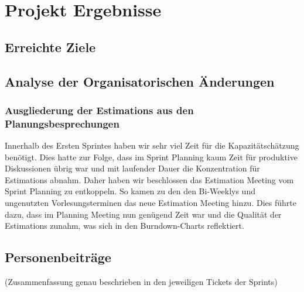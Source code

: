 
\chapter{Projekt Ergebnisse}

\section{Erreichte Ziele}

\section{Analyse der Organisatorischen Änderungen}

\subsection{Ausgliederung der Estimations aus den Planungsbesprechungen}

Innerhalb des Ersten Sprintes haben wir sehr viel Zeit für die Kapazitätschätzung benötigt. 
Dies hatte zur Folge, dass im Sprint Planning kaum Zeit für produktive Diskussionen übrig war und mit laufender Dauer die Konzentration für Estimations abnahm.
Daher haben wir beschlossen das Estimation Meeting vom Sprint Planning zu entkoppeln.
So kamen zu den den Bi-Weeklys und ungenutzten Vorlesungsterminen das neue Estimation Meeting hinzu.
Dies führte dazu, dass im Planning Meeting nun genügend Zeit war und die Qualität der Estimations zunahm, was sich in den Burndown-Charts reflektiert.

\section{Personenbeiträge}
(Zusammenfassung genau beschrieben in den jeweiligen Tickets der Sprints)